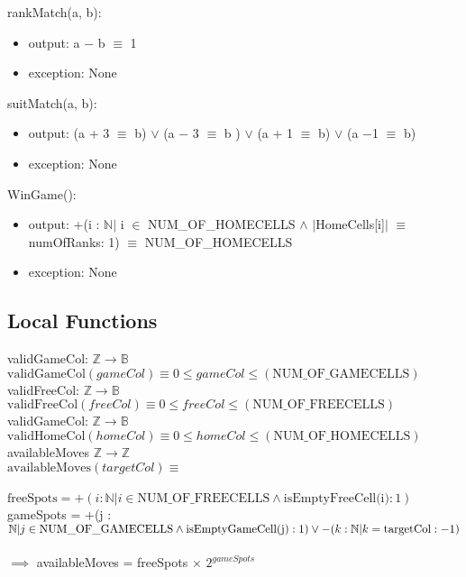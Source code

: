 \documentclass[12pt]{article}
\begin{document}
\noindent rankMatch(a, b):
\begin{itemize}
\item output: a $-$ b $\equiv$ 1
\item exception: None
\end{itemize}

\noindent suitMatch(a, b):
\begin{itemize}
\item output: (a + 3 $\equiv$ b) $\vee$ (a $-$ 3 $\equiv$ b ) $\vee$ (a + 1 $\equiv$ b) $\vee$ (a $-$1 $\equiv$ b)
\item exception: None
\end{itemize}


\noindent WinGame():
\begin{itemize}
\item output: +(i : $\mathbb{N} |$ i $\in$ NUM\_OF\_HOMECELLS $\wedge$ $|$HomeCells[i]$|$ $\equiv$ numOfRanks: 1) $\equiv$ NUM\_OF\_HOMECELLS
\item exception: None
\end{itemize}


 \subsection* {Local Functions} 
 
 \noindent validGameCol: $\mathbb{Z} \rightarrow \mathbb{B}$\\
\noindent $\mbox{validGameCol}(gameCol) \equiv 0 \leq gameCol \leq (\mbox{NUM\_OF\_GAMECELLS})$\\
 
 \noindent validFreeCol: $\mathbb{Z} \rightarrow \mathbb{B}$\\
\noindent $\mbox{validFreeCol}(freeCol) \equiv 0 \leq freeCol \leq (\mbox{NUM\_OF\_FREECELLS})$\\
 
 \noindent validGameCol: $\mathbb{Z} \rightarrow \mathbb{B}$\\
\noindent $\mbox{validHomeCol}(homeCol) \equiv 0 \leq homeCol \leq (\mbox{NUM\_OF\_HOMECELLS})$\\

 \noindent availableMoves $\mathbb{Z} \rightarrow \mathbb{Z}$\\
\noindent $\mbox{availableMoves}(targetCol) \equiv$\\\\ 
$\mbox{freeSpots} =  +(i : \mathbb{N}| i \in  \mbox{NUM\_OF\_FREECELLS} \wedge \mbox{isEmptyFreeCell(i)}: 1)$\\
gameSpots = +(j : $\mathbb{N}| j \in  \mbox{NUM\_OF\_GAMECELLS} \wedge \mbox{isEmptyGameCell(j)}: 1) \\ \vee -(k : \mathbb{N} | k = \mbox{targetCol} : -1)$ \\\\
$\implies$ availableMoves = freeSpots $\times$ $2^{gameSpots}$
\end{document}

